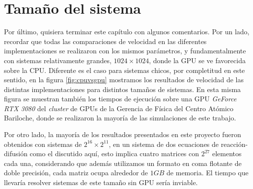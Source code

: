 \section{Tamaño del sistema}

Por último, quisiera terminar este capítulo con algunos comentarios. Por un lado, recordar que todas las comparaciones de velocidad en las diferentes 
implementaciones se realizaron con los mismos parámetros, y fundamentalmente con sistemas relativamente grandes, $1024\times1024$, donde la GPU se ve 
favorecida sobre la CPU. Diferente es el caso para sistemas chicos, por completitud en este sentido, en la figura \ref{fig:cpuvsgpu} mostramos 
los resultados de velocidad de las distintas implementaciones para distintos tamaños de sistemas. En esta misma figura se muestran también los tiempos de ejecución 
sobre una GPU \textit{GeForce RTX 3080} del \textit{cluster} de GPUs de la Gerencia de Física del Centro Atómico Bariloche, donde se realizaron la mayoría de las simulaciones de este trabajo.

Por otro lado, la mayoría de los resultados presentados en este proyecto fueron obtenidos con sistemas de $2^{16} \times 2^{11}$, en un sistema de dos ecuaciones de reacción-difusión como el discutido aquí,
esto implica cuatro matrices con $2^{27}$ elementos cada una, considerando que además utilizamos un formato en coma flotante de doble precisión, cada 
matriz ocupa alrededor de $1GB$ de memoria. El tiempo que llevaría resolver sistemas de este tamaño sin GPU sería inviable. 

